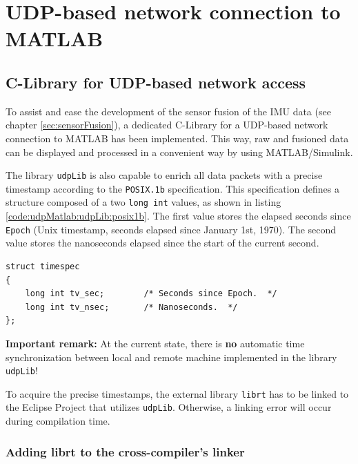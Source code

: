 \chapter{UDP-based network connection to MATLAB}
\label{sec:udpMatlab}

\section{C-Library for UDP-based network access}
\label{sec:udpMatlab:udpLib}

To assist and ease the development of the sensor fusion of the IMU data (see chapter \ref{sec:sensorFusion}), a dedicated C-Library for a UDP-based network connection to MATLAB has been implemented. This way, raw and fusioned data can be displayed and processed in a convenient way by using MATLAB/Simulink.

The library \texttt{udpLib} is also capable to enrich all data packets with a precise timestamp according to the \texttt{POSIX.1b} specification. This specification defines a structure composed of a two \texttt{long int} values, as shown in listing \ref{code:udpMatlab:udpLib:posix1b}. The first value stores the elapsed seconds since \texttt{Epoch} (Unix timestamp, seconds elapsed since January 1st, 1970). The second value stores the nanoseconds elapsed since the start of the current second.

\begin{lstlisting}[caption=C-Code snippet of a POSIX.1b conform time specification structure,label=code:udpMatlab:udpLib:posix1b]
struct timespec
{
	long int tv_sec;		/* Seconds since Epoch.  */
	long int tv_nsec;		/* Nanoseconds.  */
};
\end{lstlisting}
\textbf{Important remark:} At the current state, there is \textbf{no} automatic time synchronization between local and remote machine implemented in the library \texttt{udpLib}!

To acquire the precise timestamps, the external library \texttt{librt} has to be linked to the Eclipse Project that utilizes \texttt{udpLib}. Otherwise, a linking error will occur during compilation time.

\subsection{Adding librt to the cross-compiler's linker}
\label{sec:udpMatlab:udpLib:linkerSetup}

